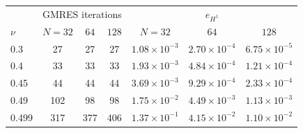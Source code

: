 \begin{tabular}{l ccc ccc}
\toprule
& \multicolumn{3}{c}{GMRES iterations} & \multicolumn{3}{c}{$e_{H^1}$}\\
$\nu$ & $N=32$ & $64$ & $128$ & $N=32$ & $64$ & $128$\\
\midrule
0.3 & 27 & 27 & 27 & $1.08{\times}10^{-3}$ & $2.70{\times}10^{-4}$ & $6.75{\times}10^{-5}$\\
0.4 & 33 & 33 & 33 & $1.93{\times}10^{-3}$ & $4.84{\times}10^{-4}$ & $1.21{\times}10^{-4}$\\
0.45 & 44 & 44 & 44 & $3.69{\times}10^{-3}$ & $9.29{\times}10^{-4}$ & $2.33{\times}10^{-4}$\\
0.49 & 102 & 98 & 98 & $1.75{\times}10^{-2}$ & $4.49{\times}10^{-3}$ & $1.13{\times}10^{-3}$\\
0.499 & 317 & 377 & 406 & $1.37{\times}10^{-1}$ & $4.15{\times}10^{-2}$ & $1.10{\times}10^{-2}$\\
\bottomrule
\end{tabular}
